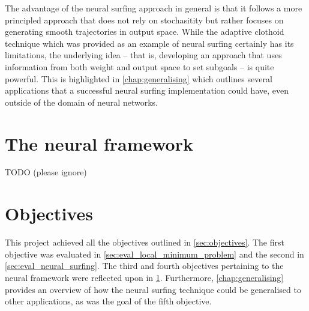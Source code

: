 The advantage of the neural surfing approach in general is that it follows a more principled approach that does not rely on stochasitity but rather focuses on generating smooth trajectories in output space.
While the adaptive clothoid technique which was provided as an example of neural surfing certainly has its limitations, the underlying idea -- that is, developing an approach that uses information from both weight and output space to set subgoals -- is quite powerful.
This is highlighted in \ref{chap:generalising} which outlines several applications that a successful neural surfing implementation could have, even outside of the domain of neural networks.

\section{The neural framework}
\label{sec:eval_neural_framework}
TODO (please ignore)





\section{Objectives}
This project achieved all the objectives outlined in \ref{sec:objectives}. 
The first objective was evaluated in \ref{sec:eval_local_minimum_problem} and the second in \ref{sec:eval_neural_surfing}.
The third and fourth objectives pertaining to the neural framework were reflected upon in \ref{sec:eval_neural_framework}.
Furthermore, \ref{chap:generalising} provides an overview of how the neural surfing technique could be generalised to other applications, as was the goal of the fifth objective.

